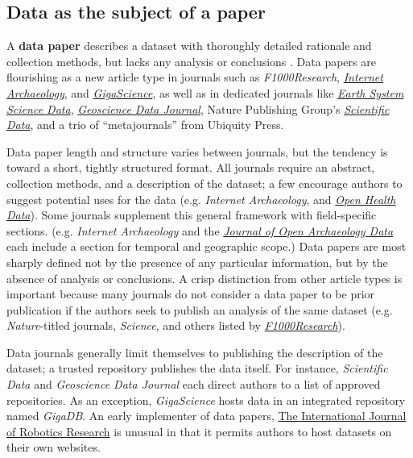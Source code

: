 \documentclass[10pt,a4paper,twocolumn]{article}
\begin{document}
\subsection*{Data as the subject of a paper}\label{paper-subject-data}

A \textbf{data paper} describes a dataset with thoroughly detailed rationale and collection methods, but lacks any analysis or conclusions \cite{newman_data_2009}.
Data papers are flourishing as a new article type in journals such as \emph{F1000Research}, \href{http://www.internetarchaeology.org/}{\emph{Internet Archaeology}}, and \href{http://www.gigasciencejournal.com/}{\emph{GigaScience}}, as well as in dedicated journals like \href{http://www.earth-system-science-data.net/}{\emph{Earth System Science Data}}\cite{pfeiffenberger_earth_2011}, \href{http://onlinelibrary.wiley.com/journal/10.1002/%28ISSN%292049-6060}{\emph{Geoscience Data Journal}}, Nature Publishing Group's \href{http://www.nature.com/scientificdata/}{\emph{Scientific Data}}, and a trio of ``metajournals'' from Ubiquity Press.

Data paper length and structure varies between journals, but the tendency is toward a short, tightly structured format.
All journals require an abstract, collection methods, and a description of the dataset; a few encourage authors to suggest potential uses for the data (e.g. \emph{Internet Archaeology}, and \href{http://openhealthdata.metajnl.com/about/submissions#authorGuidelines}{\emph{Open Health Data}}).
Some journals supplement this general framework with field-specific sections. 
(e.g. \emph{Internet Archaeology} and the \href{http://openarchaeologydata.metajnl.com/}{\emph{Journal of Open Archaeology Data}} each include a section for temporal and geographic scope.)
Data papers are most sharply defined not by the presence of any particular information, but by the absence of analysis or conclusions.
A crisp distinction from other article types is important because many journals do not consider a data paper to be prior publication if the authors seek to publish an analysis of the same dataset (e.g. \textit{Nature}-titled journals, \emph{Science}, and others listed by \href{https://f1000research.com/data-policies}{\textit{F1000Research}}).

Data journals generally limit themselves to publishing the description of the dataset; a trusted repository publishes the data itself.
For instance, \emph{Scientific Data} and \emph{Geoscience Data Journal} each direct authors to a list of approved repositories.
As an exception, \emph{GigaScience} hosts data in an integrated repository named \emph{GigaDB}.
An early implementer of data papers, \href{http://www.ijrr.org/}{The International Journal of Robotics Research}\cite{newman_data_2009} is unusual in that it permits authors to host datasets on their own websites.
\end{document}

